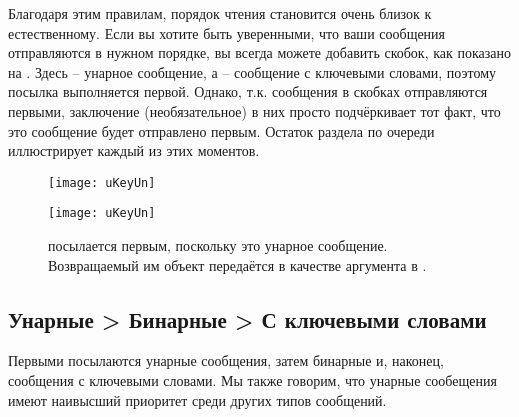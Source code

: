 \documentclass[a4paper,10pt,twoside]{book}
\begin{document}
Благодаря этим правилам, порядок чтения становится очень близок к естественному. Если вы хотите быть уверенными, что ваши сообщения отправляются в нужном порядке, вы всегда можете добавить скобок, как показано на . Здесь  -- унарное сообщение, а  -- сообщение с ключевыми словами, поэтому посылка  выполняется первой. Однако, т.к. сообщения в скобках отправляются первыми, заключение (необязательное) в них  просто подчёркивает тот факт, что это сообщение будет отправлено первым. Остаток раздела по очереди иллюстрирует каждый из этих моментов.

\begin{figure}[ht]
\ifluluelse
	{\centerline{\texttt{[image: uKeyUn]}} }
	{\centerline{\texttt{[image: uKeyUn]}} }
\caption{ посылается первым, поскольку это унарное сообщение. Возвращаемый им объект передаётся в качестве аргумента в .}
\end{figure}

\subsection*{Унарные > Бинарные > С ключевыми словами}
Первыми посылаются унарные сообщения, затем бинарные и, наконец, сообщения с ключевыми словами. Мы также говорим, что унарные сообещения имеют наивысший приоритет среди других типов сообщений.
\end{document}
